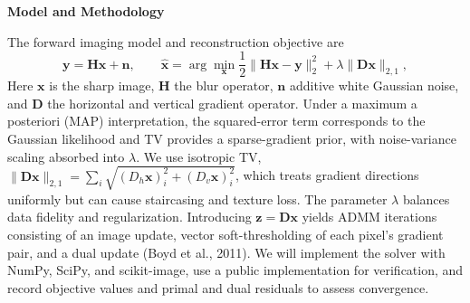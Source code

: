 \documentclass[10pt,letterpaper]{article}
\newcommand{\sectiontitle}[1]{%
  \vspace{2pt}\textcolor{accent}{\fontsize{10.8}{12.2}\selectfont\bfseries #1}\par\vspace{-1pt}%
}
\begin{document}
\sectiontitle{Model and Methodology}
 The forward imaging model and reconstruction objective are
\[
  \mathbf{y}=\mathbf{H}\mathbf{x}+\mathbf{n},
  \qquad
  \widehat{\mathbf{x}}=
  \arg\min_{\mathbf{x}}
  \frac{1}{2}\lVert\mathbf{H}\mathbf{x}-\mathbf{y}\rVert_2^2
  +\lambda\lVert\mathbf{D}\mathbf{x}\rVert_{2,1},
\]
Here $\mathbf{x}$ is the sharp image, $\mathbf{H}$ the blur operator, $\mathbf{n}$ additive white Gaussian noise, and $\mathbf{D}$ the horizontal and vertical gradient operator. Under a maximum a posteriori (MAP) interpretation, the squared-error term corresponds to the Gaussian likelihood and TV provides a sparse-gradient prior, with noise-variance scaling absorbed into $\lambda$. We use isotropic TV, $\lVert\mathbf{D}\mathbf{x}\rVert_{2,1}=\sum_i\sqrt{(D_h\mathbf{x})_i^2+(D_v\mathbf{x})_i^2}$, which treats gradient directions uniformly but can cause staircasing and texture loss. The parameter $\lambda$ balances data fidelity and regularization. Introducing $\mathbf{z}=\mathbf{D}\mathbf{x}$ yields ADMM iterations consisting of an image update, vector soft-thresholding of each pixel's gradient pair, and a dual update (Boyd et al., 2011). We will implement the solver with NumPy, SciPy, and scikit-image, use a public implementation for verification, and record objective values and primal and dual residuals to assess convergence.
\end{document}
